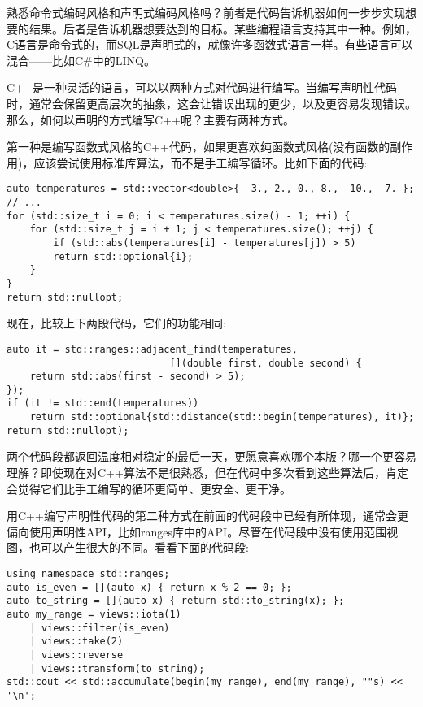 
熟悉命令式编码风格和声明式编码风格吗？前者是代码告诉机器如何一步步实现想要的结果。后者是告诉机器想要达到的目标。某些编程语言支持其中一种。例如，C语言是命令式的，而SQL是声明式的，就像许多函数式语言一样。有些语言可以混合——比如C\#中的LINQ。

C++是一种灵活的语言，可以以两种方式对代码进行编写。当编写声明性代码时，通常会保留更高层次的抽象，这会让错误出现的更少，以及更容易发现错误。那么，如何以声明的方式编写C++呢？主要有两种方式。

第一种是编写函数式风格的C++代码，如果更喜欢纯函数式风格(没有函数的副作用)，应该尝试使用标准库算法，而不是手工编写循环。比如下面的代码:

\begin{lstlisting}[style=styleCXX]
auto temperatures = std::vector<double>{ -3., 2., 0., 8., -10., -7. };
// ...
for (std::size_t i = 0; i < temperatures.size() - 1; ++i) {
	for (std::size_t j = i + 1; j < temperatures.size(); ++j) {
		if (std::abs(temperatures[i] - temperatures[j]) > 5)
		return std::optional{i};
	}
}
return std::nullopt;
\end{lstlisting}

现在，比较上下两段代码，它们的功能相同:

\begin{lstlisting}[style=styleCXX]
auto it = std::ranges::adjacent_find(temperatures,
							[](double first, double second) {
	return std::abs(first - second) > 5);
});
if (it != std::end(temperatures))
	return std::optional{std::distance(std::begin(temperatures), it)};
return std::nullopt);
\end{lstlisting}

两个代码段都返回温度相对稳定的最后一天，更愿意喜欢哪个本版？哪一个更容易理解？即使现在对C++算法不是很熟悉，但在代码中多次看到这些算法后，肯定会觉得它们比手工编写的循环更简单、更安全、更干净。

用C++编写声明性代码的第二种方式在前面的代码段中已经有所体现，通常会更偏向使用声明性API，比如ranges库中的API。尽管在代码段中没有使用范围视图，也可以产生很大的不同。看看下面的代码段:

\begin{lstlisting}[style=styleCXX]
using namespace std::ranges;
auto is_even = [](auto x) { return x % 2 == 0; };
auto to_string = [](auto x) { return std::to_string(x); };
auto my_range = views::iota(1)
	| views::filter(is_even)
	| views::take(2)
	| views::reverse
	| views::transform(to_string);
std::cout << std::accumulate(begin(my_range), end(my_range), ""s) << '\n';
\end{lstlisting}


